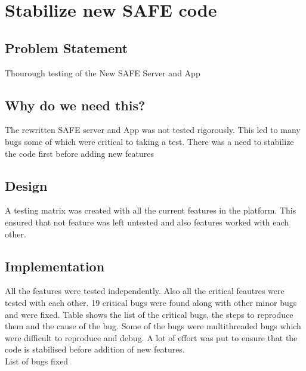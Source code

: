 \clearpage
\section{Stabilize new SAFE code} 
\hspace{0.5cm} 

\subsection{Problem Statement}
	Thourough testing of the New SAFE Server and App

\subsection{Why do we need this?}
	The rewritten SAFE server and App was not tested rigorously. This led to many bugs some of which were critical to taking a test. There was a need to stabilize the code first before adding new features

\subsection{Design}
	A testing matrix was created with all the current features in the platform. This ensured that not feature was left untested and also features worked with each other.

\subsection{Implementation}
	All the features were tested independently. Also all the critical feautres were tested with each other. 19 critical bugs were found along with other minor bugs and were fixed. Table shows the list of the critical bugs, the steps to reproduce them and the cause of the bug. Some of the bugs were multithreaded bugs which were difficult to reproduce and debug. A lot of effort was put to ensure that the code is stabilised before addition of new features.\\

    List of bugs fixed
    
